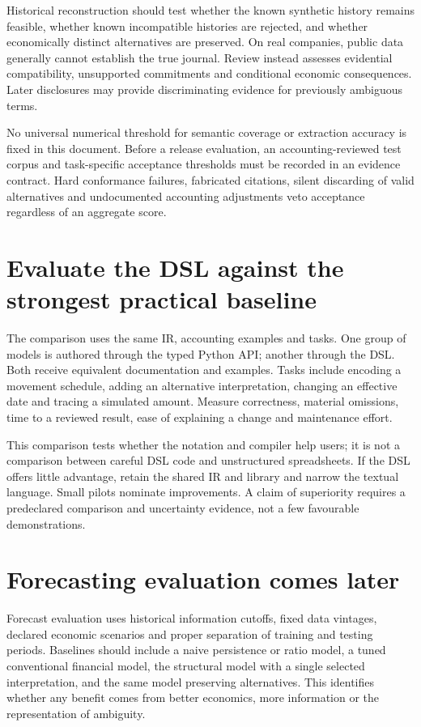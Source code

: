 Historical reconstruction should test whether the known synthetic history
remains feasible, whether known incompatible histories are rejected, and
whether economically distinct alternatives are preserved. On real companies,
public data generally cannot establish the true journal. Review instead
assesses evidential compatibility, unsupported commitments and conditional
economic consequences. Later disclosures may provide discriminating evidence
for previously ambiguous terms.

No universal numerical threshold for semantic coverage or extraction accuracy
is fixed in this document. Before a release evaluation, an accounting-reviewed
test corpus and task-specific acceptance thresholds must be recorded in an
evidence contract. Hard conformance failures, fabricated citations, silent
discarding of valid alternatives and undocumented accounting adjustments veto
acceptance regardless of an aggregate score.

\section{Evaluate the DSL against the strongest practical baseline}

The comparison uses the same IR, accounting examples and tasks. One group of
models is authored through the typed Python API; another through the DSL.
Both receive equivalent documentation and examples. Tasks include encoding a
movement schedule, adding an alternative interpretation, changing an effective
date and tracing a simulated amount. Measure correctness, material omissions,
time to a reviewed result, ease of explaining a change and maintenance effort.

This comparison tests whether the notation and compiler help users; it is not
a comparison between careful DSL code and unstructured spreadsheets. If the
DSL offers little advantage, retain the shared IR and library and narrow the
textual language. Small pilots nominate improvements. A claim of superiority
requires a predeclared comparison and uncertainty evidence, not a few favourable
demonstrations.

\section{Forecasting evaluation comes later}

Forecast evaluation uses historical information cutoffs, fixed data vintages,
declared economic scenarios and proper separation of training and testing
periods. Baselines should include a naive persistence or ratio model, a tuned
conventional financial model, the structural model with a single selected
interpretation, and the same model preserving alternatives. This identifies
whether any benefit comes from better economics, more information or the
representation of ambiguity.

